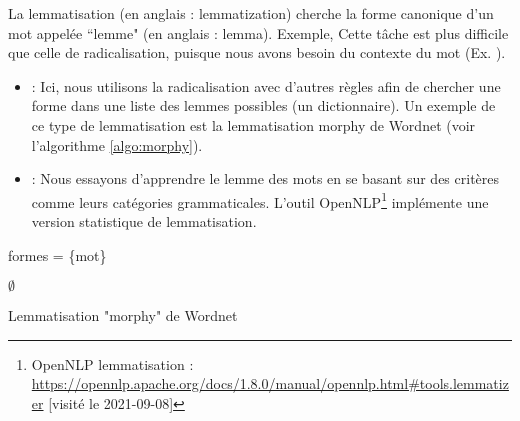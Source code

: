 \documentclass{KodeBook}
\begin{document}
La lemmatisation (en anglais : lemmatization) cherche la forme canonique d'un mot appelée ``lemme" (en anglais : lemma).
Exemple, 
Cette tâche est plus difficile que celle de radicalisation, puisque nous avons besoin du contexte du mot (Ex. ). 
\begin{itemize}
	\item {} : Ici, nous utilisons la radicalisation avec d'autres règles afin de chercher une forme dans une liste des lemmes possibles (un dictionnaire).
	Un exemple de ce type de lemmatisation est la lemmatisation morphy de Wordnet (voir l'algorithme \ref{algo:morphy}).
	
	\item {} : Nous essayons d'apprendre le lemme des mots en se basant sur des critères comme leurs catégories grammaticales.
	L'outil OpenNLP\footnote{OpenNLP lemmatisation : \url{https://opennlp.apache.org/docs/1.8.0/manual/opennlp.html\#tools.lemmatizer} [visité le 2021-09-08]} implémente une version statistique de lemmatisation.

\end{itemize}

\begin{algorithm}[H]
		
		
		formes = \{mot\}
		
		
		\Return $ \emptyset $\;
		
		\caption{Lemmatisation "morphy" de Wordnet \label{algo:morphy}}
		
	\end{algorithm}
\end{document}
